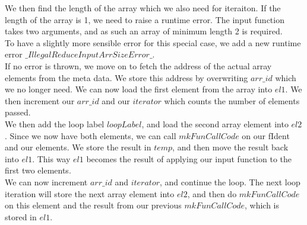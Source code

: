 \documentclass[12pt]{article}
\begin{document}
We then find the length of the array which we also need for iteraiton. If the length of the array is 1, we need to raise a runtime error. The input function takes two arguments, and as such an array of minimum length 2 is required.\\
To have a slightly more sensible error for this special case, we add a new runtime error $\_IllegalReduceInputArrSizeError\_$.\\

If no error is thrown, we move on to fetch the address of the actual array elements from the meta data. We store this address by overwriting $arr\_id$ which we no longer need. We can now load the first element from the array into $el1$. We then increment our $arr\_id$ and our $iterator$ which counts the number of elements passed.\\

We then add the loop label $loopLabel$, and load the second array element into $el2$. Since we now have both elements, we can call $mkFunCallCode$ on our fIdent and our elements. We store the result in $temp$, and then move the result back into $el1$. This way $el1$ becomes the result of applying our input function to the first two elements.\\
We can now increment $arr\_id$ and $iterator$, and continue the loop. The next loop iteration will store the next array element into $el2$, and then do $mkFunCallCode$ on this element and the result from our previous $mkFunCallCode$, which is stored in $el1$.
\end{document}

